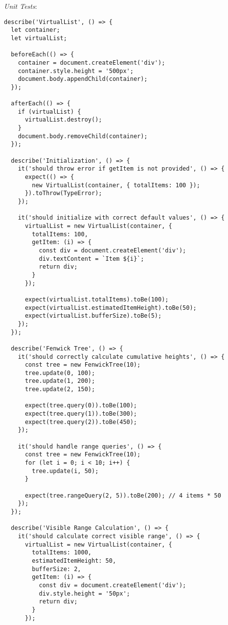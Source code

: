 \documentclass[11pt]{article}
\begin{document}
\emph{Unit Tests}:

\begin{verbatim}
describe('VirtualList', () => {
  let container;
  let virtualList;
  
  beforeEach(() => {
    container = document.createElement('div');
    container.style.height = '500px';
    document.body.appendChild(container);
  });
  
  afterEach(() => {
    if (virtualList) {
      virtualList.destroy();
    }
    document.body.removeChild(container);
  });
  
  describe('Initialization', () => {
    it('should throw error if getItem is not provided', () => {
      expect(() => {
        new VirtualList(container, { totalItems: 100 });
      }).toThrow(TypeError);
    });
    
    it('should initialize with correct default values', () => {
      virtualList = new VirtualList(container, {
        totalItems: 100,
        getItem: (i) => {
          const div = document.createElement('div');
          div.textContent = `Item ${i}`;
          return div;
        }
      });
      
      expect(virtualList.totalItems).toBe(100);
      expect(virtualList.estimatedItemHeight).toBe(50);
      expect(virtualList.bufferSize).toBe(5);
    });
  });
  
  describe('Fenwick Tree', () => {
    it('should correctly calculate cumulative heights', () => {
      const tree = new FenwickTree(10);
      tree.update(0, 100);
      tree.update(1, 200);
      tree.update(2, 150);
      
      expect(tree.query(0)).toBe(100);
      expect(tree.query(1)).toBe(300);
      expect(tree.query(2)).toBe(450);
    });
    
    it('should handle range queries', () => {
      const tree = new FenwickTree(10);
      for (let i = 0; i < 10; i++) {
        tree.update(i, 50);
      }
      
      expect(tree.rangeQuery(2, 5)).toBe(200); // 4 items * 50
    });
  });
  
  describe('Visible Range Calculation', () => {
    it('should calculate correct visible range', () => {
      virtualList = new VirtualList(container, {
        totalItems: 1000,
        estimatedItemHeight: 50,
        bufferSize: 2,
        getItem: (i) => {
          const div = document.createElement('div');
          div.style.height = '50px';
          return div;
        }
      });
      

\end{verbatim}
\end{document}
